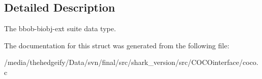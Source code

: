 \subsection{Detailed Description}
The bbob-\/biobj-\/ext suite data type. 

The documentation for this struct was generated from the following file\+:\begin{DoxyCompactItemize}
\item 
/media/thehedgeify/\+Data/svn/final/src/shark\+\_\+version/src/\+C\+O\+C\+Ointerface/coco.\+c\end{DoxyCompactItemize}
